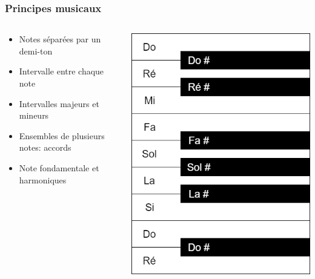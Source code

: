 \documentclass{beamer}
\begin{document}
\begin{frame}
\frametitle{Principes musicaux}
\begin{columns}

\begin{column}{7cm}
\begin{itemize}
    \item Notes séparées par un demi-ton
    \item Intervalle entre chaque note
    \item Intervalles majeurs et mineurs
    \item Ensembles de plusieurs notes: accords
    \item Note fondamentale et harmoniques
\end{itemize}
\end{column}

\begin{column}{5cm}
\begin{center}
\includegraphics[scale=0.3]{img/Piano.png}
\end{center}
\end{column}

\end{columns}
\end{frame}
\end{document}
